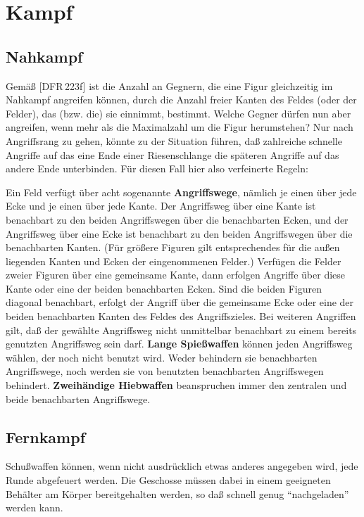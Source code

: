 \documentclass[10pt,a4paper,germanpar]{article}
\begin{document}
\section{Kampf}

\subsection{Nahkampf}

Gemäß [DFR\,223f] ist die Anzahl an Gegnern, die eine Figur
gleichzeitig im Nahkampf angreifen können, durch die Anzahl freier
Kanten des Feldes (oder der Felder), das (bzw. die) sie einnimmt,
bestimmt. Welche Gegner dürfen nun aber angreifen, wenn mehr als die
Maximalzahl um die Figur herumstehen? Nur nach Angriffsrang zu gehen,
könnte zu der Situation führen, daß zahlreiche schnelle Angriffe auf
das eine Ende einer Riesenschlange die späteren Angriffe auf das
andere Ende unterbinden. Für diesen Fall hier also verfeinerte Regeln:

Ein Feld verfügt über acht sogenannte \textbf{Angriffswege}, nämlich
je einen über jede Ecke und je einen über jede Kante. Der Angriffsweg
über eine Kante ist benachbart zu den beiden Angriffswegen über die
benachbarten Ecken, und der Angriffsweg über eine Ecke ist benachbart
zu den beiden Angriffswegen über die benachbarten Kanten. (Für größere
Figuren gilt entsprechendes für die außen liegenden Kanten und Ecken
der eingenommenen Felder.) Verfügen die Felder zweier Figuren über
eine gemeinsame Kante, dann erfolgen Angriffe über diese Kante oder
eine der beiden benachbarten Ecken. Sind die beiden Figuren diagonal
benachbart, erfolgt der Angriff über die gemeinsame Ecke oder eine der
beiden benachbarten Kanten des Feldes des Angriffszieles. Bei weiteren
Angriffen gilt, daß der gewählte Angriffsweg nicht unmittelbar
benachbart zu einem bereits genutzten Angriffsweg sein
darf. \textbf{Lange Spießwaffen} können jeden Angriffsweg wählen, der
noch nicht benutzt wird. Weder behindern sie benachbarten
Angriffswege, noch werden sie von benutzten benachbarten Angriffswegen
behindert. \textbf{Zweihändige Hiebwaffen} beanspruchen immer den
zentralen und beide benachbarten Angriffswege.

\subsection{Fernkampf}

Schußwaffen können, wenn nicht ausdrücklich etwas anderes angegeben
wird, jede Runde abgefeuert werden. Die Geschosse müssen dabei in einem
geeigneten Behälter am Körper bereitgehalten werden, so daß schnell
genug "`nachgeladen"' werden kann.
\end{document}
